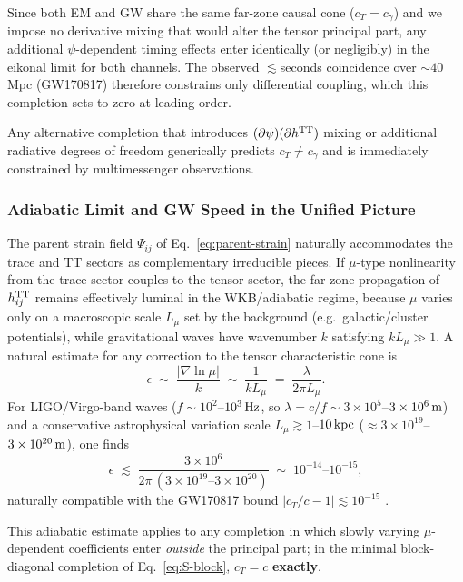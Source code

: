 Since both EM and GW share the same far-zone causal cone ($c_T = c_\gamma$) and we impose no derivative mixing that would alter the tensor principal part, any additional $\psi$-dependent timing effects enter identically (or negligibly) in the eikonal limit for both channels. The observed $\lesssim$seconds coincidence over $\sim 40$ Mpc (GW170817) therefore constrains only differential coupling, which this completion sets to zero at leading order.

Any alternative completion that introduces $(\partial\psi)(\partial h^{\rm TT})$ mixing or additional radiative degrees of freedom generically predicts $c_T \neq c_\gamma$ and is immediately constrained by multimessenger observations.

\subsubsection{Adiabatic Limit and GW Speed in the Unified Picture}

The parent strain field $\Psi_{ij}$ of Eq.~\eqref{eq:parent-strain} naturally accommodates the trace and TT sectors as complementary irreducible pieces.  If $\mu$-type nonlinearity from the trace sector couples to the tensor sector, the far-zone
propagation of $h_{ij}^{\rm TT}$ remains effectively luminal in the WKB/adiabatic
regime, because $\mu$ varies only on a macroscopic scale $L_\mu$ set by the
background (e.g.\ galactic/cluster potentials), while gravitational waves have
wavenumber $k$ satisfying $kL_\mu\gg 1$.
A natural estimate for any correction to the tensor characteristic cone is
\begin{equation}\label{eq:wkb-suppression}
\epsilon \;\sim\; \frac{|\nabla \ln \mu|}{k} \;\sim\; \frac{1}{kL_\mu}
\;=\;\frac{\lambda}{2\pi L_\mu}.
\end{equation}
For LIGO/Virgo-band waves ($f\sim 10^2$--$10^3\,{\rm Hz}$, so
$\lambda=c/f\sim 3\times 10^5$--$3\times 10^6\,{\rm m}$) and a conservative
astrophysical variation scale $L_\mu\gtrsim 1$--$10\,{\rm kpc}$ 
($\approx 3\times 10^{19}$--$3\times 10^{20}\,{\rm m}$), one finds
\begin{equation}
\epsilon \;\lesssim\; \frac{3\times 10^6}{2\pi\,(3\times 10^{19}\text{--}3\times 10^{20})}
\;\sim\;10^{-14}\text{--}10^{-15},
\end{equation}
naturally compatible with the GW170817 bound $|c_T/c-1|\lesssim 10^{-15}$ \cite{Abbott2017GW}.

This adiabatic estimate applies to any completion in which slowly varying $\mu$-dependent coefficients enter \textit{outside} the principal part; in the minimal block-diagonal completion of Eq.~\eqref{eq:S-block}, $c_T = c$ \textbf{exactly}.

